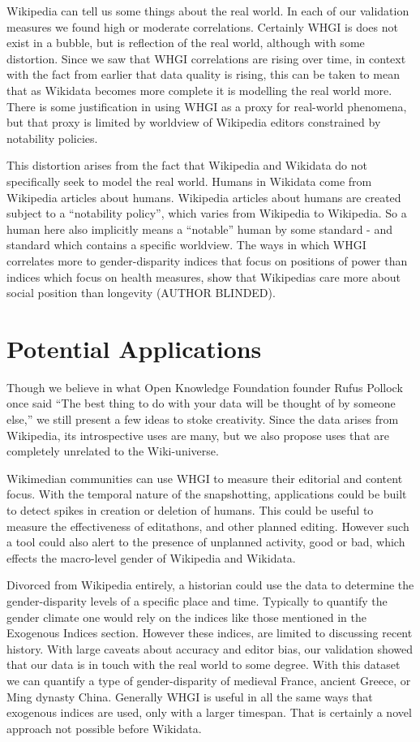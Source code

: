 \documentclass[letterpaper]{article}
\begin{document}
Wikipedia can tell us some things about the real world. In each of our validation measures we found high or moderate correlations. Certainly WHGI is does not exist in a bubble, but is reflection of the real world, although with some distortion. Since we saw that WHGI correlations are rising over time, in context with the fact from earlier that data quality is rising, this can be taken to mean that as Wikidata becomes more complete it is modelling the real world more. There is some justification in using WHGI as a proxy for real-world phenomena, but that proxy is limited by worldview of Wikipedia editors constrained by notability policies. 

This distortion arises from the fact that Wikipedia and Wikidata do not specifically seek to model the real world. Humans in Wikidata come from Wikipedia articles about humans. Wikipedia articles about humans are created subject to a ``notability policy'', which varies from Wikipedia to Wikipedia. So a human here also implicitly means a ``notable'' human by some standard - and standard which contains a specific worldview. The ways in which WHGI correlates more to gender-disparity indices that focus on positions of power than indices which focus on health measures, show that Wikipedias care more about social position than longevity (AUTHOR BLINDED).


\section{Potential Applications}
Though we believe in what Open Knowledge Foundation founder Rufus Pollock once said ``The best thing to do with your data will be thought of by someone else,'' we still present a few ideas to stoke creativity. Since the data arises from Wikipedia, its introspective uses are many, but we also propose uses that are completely unrelated to the Wiki-universe. 

Wikimedian communities can use WHGI to measure their editorial and content focus. With the temporal nature of the snapshotting, applications could be built to detect spikes in creation or deletion of humans. This could be useful to measure the effectiveness of editathons, and other planned editing. However such a tool could also alert to the presence of unplanned activity, good or bad, which effects the macro-level gender of Wikipedia and Wikidata.

Divorced from Wikipedia entirely, a historian could use the data to determine the gender-disparity levels of a specific place and time. Typically to quantify the gender climate one would rely on the indices like those mentioned in the Exogenous Indices section. However these indices, are limited to discussing recent history. With large caveats about accuracy and editor bias, our validation showed that our data is in touch with the real world to some degree. With this dataset we can quantify a type of gender-disparity of medieval France, ancient Greece, or Ming dynasty China. Generally WHGI is useful in all the same ways that exogenous indices are used, only with a larger timespan. That is certainly a novel approach not possible before Wikidata.
\end{document}
